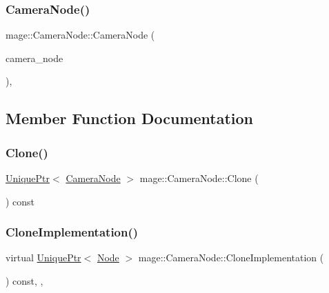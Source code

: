 \hypertarget{classmage_1_1_camera_node_af46b911ecf12ed7c3cb31fb98a590fc1}{}\label{classmage_1_1_camera_node_af46b911ecf12ed7c3cb31fb98a590fc1} 
\subsubsection{\texorpdfstring{Camera\+Node()}{CameraNode()}\hspace{0.1cm}{\footnotesize\ttfamily [3/3]}}
{\footnotesize\ttfamily mage\+::\+Camera\+Node\+::\+Camera\+Node (\begin{DoxyParamCaption}\item[{\hyperlink{classmage_1_1_camera_node}{Camera\+Node} \&\&}]{camera\+\_\+node }\end{DoxyParamCaption})\hspace{0.3cm}{\ttfamily [protected]}, {\ttfamily [default]}}



\subsection{Member Function Documentation}
\hypertarget{classmage_1_1_camera_node_a6c636830efadf9753f2f0d012153d61f}{}\label{classmage_1_1_camera_node_a6c636830efadf9753f2f0d012153d61f} 
\subsubsection{\texorpdfstring{Clone()}{Clone()}}
{\footnotesize\ttfamily \hyperlink{namespacemage_a8c307fbcc33bce9b7f2aa4c26c3b95cf}{Unique\+Ptr}$<$ \hyperlink{classmage_1_1_camera_node}{Camera\+Node} $>$ mage\+::\+Camera\+Node\+::\+Clone (\begin{DoxyParamCaption}{ }\end{DoxyParamCaption}) const}

\hypertarget{classmage_1_1_camera_node_a002d3a2b41cda270a26ca5d8f3a17f55}{}\label{classmage_1_1_camera_node_a002d3a2b41cda270a26ca5d8f3a17f55} 
\subsubsection{\texorpdfstring{Clone\+Implementation()}{CloneImplementation()}}
{\footnotesize\ttfamily virtual \hyperlink{namespacemage_a8c307fbcc33bce9b7f2aa4c26c3b95cf}{Unique\+Ptr}$<$ \hyperlink{classmage_1_1_node}{Node} $>$ mage\+::\+Camera\+Node\+::\+Clone\+Implementation (\begin{DoxyParamCaption}{ }\end{DoxyParamCaption}) const\hspace{0.3cm}{\ttfamily [override]}, {\ttfamily [private]}, {}}


